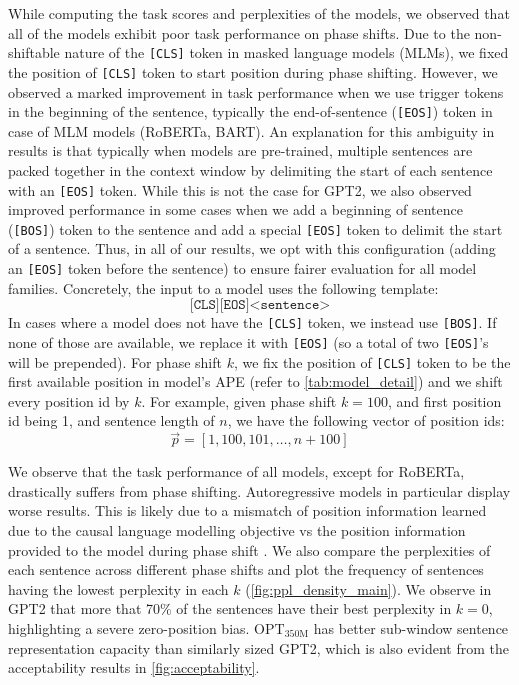 \documentclass[letterpaper, 12pt]{report}
\begin{document}
While computing the task scores and perplexities of the models, we observed that all of the models exhibit poor task performance on phase shifts.
Due to the non-shiftable nature of the \texttt{[CLS]} token in masked language models (MLMs), we fixed the position of \texttt{[CLS]} token to start position during phase shifting.
However, we observed a marked improvement in task performance when we use trigger tokens in the beginning of the sentence, typically the end-of-sentence (\texttt{[EOS]}) token in case of MLM models (RoBERTa, BART).
An explanation for this ambiguity in results is that typically when models are pre-trained, multiple sentences are packed together in the context window by delimiting the start of each sentence with an \texttt{[EOS]} token.
While this is not the case for GPT2, we also observed improved performance in some cases when we add a beginning of sentence (\texttt{[BOS]}) token to the sentence and add a special \texttt{[EOS]} token to delimit the start of a sentence. Thus, in all of our results, we opt with this configuration (adding an \texttt{[EOS]} token before the sentence) to ensure fairer evaluation for all model families.
Concretely, the input to a model uses the following template:
$$
\texttt{[CLS]}\texttt{[EOS]} \texttt{<sentence>}
$$
In cases where a model does not have the \texttt{[CLS]} token, we instead use \texttt{[BOS]}.
If none of those are available, we replace it with \texttt{[EOS]} (so a total of two \texttt{[EOS]}'s will be prepended).
For phase shift $k$, we fix the position of \texttt{[CLS]} token to be the first available position in model's APE (refer to \autoref{tab:model_detail}) and we shift every position id by $k$.
For example, given phase shift $k=100$, and first position id being 1, and sentence length of $n$, we have the following vector of position ids:
$$
\Vec{p} = [1, 100, 101, \dots, n+100]
$$


We observe that the task performance of all models, except for RoBERTa, drastically suffers from phase shifting. Autoregressive models in particular display worse results. This is likely due to a mismatch of position information learned due to the causal language modelling objective vs the position information provided to the model during phase shift \cite{haviv2022}. We also compare the perplexities of each sentence across different phase shifts and plot the frequency of sentences having the lowest perplexity in each $k$ (\autoref{fig:ppl_density_main}). We observe in GPT2 that more that 70\% of the sentences have their best perplexity in $k=0$, highlighting a severe zero-position bias. $\text{OPT}_{\text{350M}}$ has better sub-window sentence representation capacity than similarly sized GPT2, which is also evident from the acceptability results in \autoref{fig:acceptability}.
\end{document}
